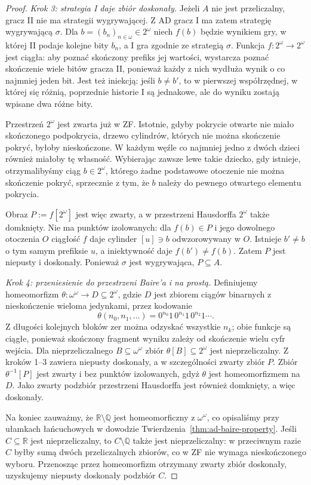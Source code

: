 \begin{proof}
\emph{Krok 3: strategia I daje zbiór doskonały.}
Jeżeli $A$ nie jest przeliczalny,
gracz II nie ma strategii wygrywającej.
Z AD gracz I ma zatem
strategię wygrywającą $\sigma$.
Dla $b=(b_n)_{n\in\omega}\in2^\omega$
niech $f(b)$ będzie wynikiem gry,
w której II podaje kolejne bity $b_n$,
a I gra zgodnie ze strategią $\sigma$.
Funkcja $f:2^\omega\to2^\omega$
jest ciągła: aby poznać skończony
prefiks jej wartości, wystarcza
poznać skończenie wiele bitów
gracza II, ponieważ każdy z nich
wydłuża wynik o co najmniej jeden bit.
Jest też iniekcją: jeśli
$b\ne b'$, to w pierwszej
współrzędnej, w której się różnią,
poprzednie historie I są jednakowe,
ale do wyniku zostają wpisane
dwa różne bity.

Przestrzeń $2^\omega$ jest zwarta
już w ZF. Istotnie, gdyby pokrycie
otwarte nie miało skończonego
podpokrycia, drzewo cylindrów,
których nie można skończenie pokryć,
byłoby nieskończone. W każdym węźle
co najmniej jedno z dwóch dzieci
również miałoby tę własność.
Wybierając zawsze lewe takie
dziecko, gdy istnieje,
otrzymalibyśmy ciąg $b\in2^\omega$,
którego żadne podstawowe otoczenie
nie można skończenie pokryć,
sprzecznie z tym, że $b$ należy
do pewnego otwartego elementu pokrycia.

Obraz $P:=f[2^\omega]$ jest więc
zwarty, a w przestrzeni Hausdorffa
$2^\omega$ także domknięty.
Nie ma punktów izolowanych:
dla $f(b)\in P$ i jego
dowolnego otoczenia $O$ ciągłość $f$
daje cylinder $[u]\ni b$
odwzorowywany w $O$.
Istnieje $b'\ne b$ o tym samym
prefiksie $u$, a iniektywność
daje $f(b')\ne f(b)$.
Zatem $P$ jest niepusty i doskonały.
Ponieważ $\sigma$ jest wygrywająca,
$P\subseteq A$.

\emph{Krok 4: przeniesienie do
przestrzeni Baire'a i na prostą.}
Definiujemy homeomorfizm
$\theta:\omega^\omega\to D\subseteq2^\omega$,
gdzie $D$ jest zbiorem ciągów binarnych
z nieskończenie wieloma jedynkami,
przez kodowanie
\[
\theta(n_0,n_1,\ldots)
=0^{n_0}1\,0^{n_1}1\,0^{n_2}1\cdots.
\]
Z długości kolejnych bloków zer
można odzyskać wszystkie $n_k$;
obie funkcje są ciągłe,
ponieważ skończony fragment wyniku
zależy od skończenie wielu cyfr wejścia.
Dla nieprzeliczalnego
$B\subseteq\omega^\omega$
zbiór $\theta[B]\subseteq2^\omega$
jest nieprzeliczalny. Z kroków 1--3
zawiera niepusty doskonały,
a w szczególności zwarty zbiór $P$.
Zbiór $\theta^{-1}[P]$
jest zwarty i bez punktów
izolowanych, gdyż $\theta$
jest homeomorfizmem na $D$.
Jako zwarty podzbiór przestrzeni
Hausdorffa jest również domknięty,
a więc doskonały.

Na koniec zauważmy, że
$\mathbb R\setminus\mathbb Q$
jest homeomorficzny z $\omega^\omega$,
co opisaliśmy przy ułamkach łańcuchowych
w dowodzie Twierdzenia~\ref{thm:ad-baire-property}.
Jeśli $C\subseteq\mathbb R$ jest
nieprzeliczalny, to
$C\setminus\mathbb Q$ także
jest nieprzeliczalny:
w przeciwnym razie $C$ byłby
sumą dwóch przeliczalnych zbiorów,
co w ZF nie wymaga nieskończonego
wyboru.
Przenosząc przez homeomorfizm
otrzymany zwarty zbiór doskonały,
uzyskujemy niepusty doskonały
podzbiór $C$.
\end{proof}

